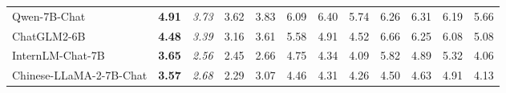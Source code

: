 \documentclass[11pt, a4paper, logo, copyright, nonumbering]{deepseek}
\begin{document}
\begin{CJK*}{UTF8}{gbsn}
\begin{table}[t]
{\begin{tabular}{@{}l|c|ccc|ccccccc@{}}
Qwen-7B-Chat                    & \textbf{4.91}                     & \multicolumn{1}{c|}{\textit{3.73}}                                   & 3.62                                            & 3.83                                            & \multicolumn{1}{c|}{6.09}                                            & 6.40                                            & 5.74                                            & 6.26                                            & 6.31                                            & 6.19                                            & 5.66                                            \\
ChatGLM2-6B                     & \textbf{4.48}                     & \multicolumn{1}{c|}{\textit{3.39}}                                   & 3.16                                            & 3.61                                            & \multicolumn{1}{c|}{5.58}                                            & 4.91                                            & 4.52                                            & 6.66                                            & 6.25                                            & 6.08                                            & 5.08                                            \\
InternLM-Chat-7B               & \textbf{3.65}                     & \multicolumn{1}{c|}{\textit{2.56}}                                   & 2.45                                            & 2.66                                            & \multicolumn{1}{c|}{4.75}                                            & 4.34                                            & 4.09                                            & 5.82                                            & 4.89                                            & 5.32                                            & 4.06                                            \\
Chinese-LLaMA-2-7B-Chat         & \textbf{3.57}                     & \multicolumn{1}{c|}{\textit{2.68}}                                   & 2.29                                            & 3.07                                            & \multicolumn{1}{c|}{4.46}                                            & 4.31                                            & 4.26                                            & 4.50                                            & 4.63                                            & 4.91                                            & 4.13                                            \\

\end{tabular}}
\end{table}
\end{CJK*}
\end{document}
